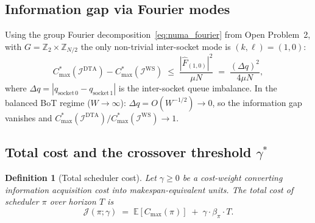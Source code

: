 \documentclass[11pt,a4paper]{report}
\newtheorem{definition}{Definition}[section]
\begin{document}
\subsection{Information gap via Fourier modes}

Using the group Fourier decomposition~\eqref{eq:numa_fourier}
from Open Problem~2, with $G = \mathbb{Z}_2 \times \mathbb{Z}_{N/2}$
the only non-trivial inter-socket mode is $(k,\ell) = (1,0)$:
\begin{equation}\label{eq:info_gap_2socket}
  C_{\max}^*(\mathcal{I}^{\mathrm{DTA}}) - C_{\max}^*(\mathcal{I}^{\mathrm{WS}})
  \;\leq\;
  \frac{|\hat{F}_{(1,0)}|^2}{\mu N}
  \;=\;
  \frac{(\Delta q)^2}{4\mu N},
\end{equation}
where $\Delta q = |q_{\mathrm{socket\,0}} - q_{\mathrm{socket\,1}}|$ is the
inter-socket queue imbalance.  In the balanced BoT regime ($W \to\infty$):
$\Delta q = O(W^{-1/2}) \to 0$, so the information gap vanishes and
$C_{\max}^*(\mathcal{I}^{\mathrm{DTA}}) / C_{\max}^*(\mathcal{I}^{\mathrm{WS}}) \to 1$.

\subsection{Total cost and the crossover threshold $\gamma^*$}

\begin{definition}[Total scheduler cost]\label{def:J}
Let $\gamma \geq 0$ be a \emph{cost-weight} converting information
acquisition cost into makespan-equivalent units.  The
\emph{total cost} of scheduler $\pi$ over horizon $T$ is
\begin{equation}\label{eq:J}
  \mathcal{J}(\pi;\gamma)
  \;=\;
  \mathbb{E}[C_{\max}(\pi)]
  \;+\;
  \gamma\cdot\beta_\pi\cdot T.
\end{equation}
\end{definition}
\end{document}
